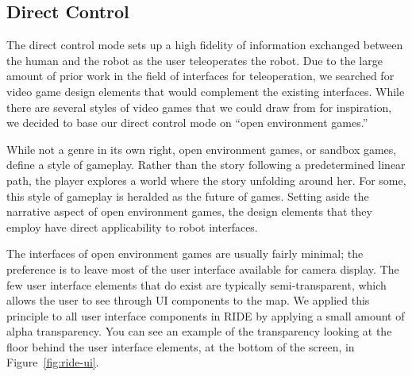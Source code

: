 
% 
% 
% 
% 

\subsection{Direct Control}

The direct control mode sets up a high fidelity of information exchanged between the human and the robot as the user teleoperates the robot. Due to the large amount of prior work in the field of interfaces for teleoperation, we searched for video game design elements that would complement the existing interfaces. While there are several styles of video games that we could draw from for inspiration, we decided to base our direct control mode on ``open environment games.''

While not a genre in its own right, open environment games, or sandbox games, define a style of gameplay. Rather than the story following a predetermined linear path, the player explores a world where the story unfolding around her. For some, this style of gameplay is heralded as the future of games. Setting aside the narrative aspect of open environment games, the design elements that they employ have direct applicability to robot interfaces.

The interfaces of open environment games are usually fairly minimal; the preference is to leave most of the user interface available for camera display. The few user interface elements that do exist are typically semi-transparent, which allows the user to see through UI components to the map. We applied this principle to all user interface components in RIDE by applying a small amount of alpha transparency. You can see an example of the transparency looking at the floor behind the user interface elements, at the bottom of the screen, in Figure~\ref{fig:ride-ui}.


